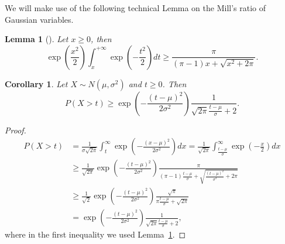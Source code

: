 \documentclass{article}
\newtheorem{lemma}[theorem]{Lemma}
\newtheorem{corrollary}[theorem]{Corollary}
\begin{document}
We will make use of the following technical Lemma on the Mill's ratio of Gaussian variables.
\begin{lemma}[\cite{Boyd59}]
\label{lemma:boyd}
Let $x\geq0$, then
\[
\exp\left(\frac{x^2}{2}\right) \int_{x}^{+\infty} \exp\left(-\frac{t^2}{2}\right) dt
\geq \frac{\pi}{(\pi-1)x+\sqrt{x^2+2 \pi}}.
\]
\end{lemma}
%
\begin{corrollary}
Let $X \sim N(\mu, \sigma^2)$ and $t \geq 0$. Then
\[
P(X>t) \geq \exp\left(-\frac{(t-\mu)^2}{2 \sigma^2}\right) \frac{1}{\sqrt{2\pi}\frac{t-\mu}{\sigma}+2}.
\]
\end{corrollary}
%
\begin{proof}
\begin{align*}
P(X>t)
&= \frac{1}{\sigma \sqrt{2 \pi}} \int_t^{\infty} \exp(-\frac{(x-\mu)^2}{2 \sigma^2}) d x
= \frac{1}{\sqrt{2 \pi}} \int_\frac{t-\mu}{\sigma}^{\infty} \exp(-\frac{x}{2}) d x \\
&\geq \frac{1}{\sqrt{2 \pi}} \exp\left(-\frac{(t-\mu)^2}{2 \sigma^2}\right) \frac{\pi}{(\pi-1)\frac{t-\mu}{\sigma}+\sqrt{\frac{(t-\mu)^2}{\sigma^2}+2 \pi}} \\
&\geq \frac{1}{\sqrt{2}} \exp\left(-\frac{(t-\mu)^2}{2 \sigma^2}\right) \frac{\sqrt{\pi}}{\pi\frac{t-\mu}{\sigma}+\sqrt{2 \pi}} \\
&= \exp\left(-\frac{(t-\mu)^2}{2 \sigma^2}\right) \frac{1}{\sqrt{2\pi}\frac{t-\mu}{\sigma}+2},
\end{align*}
where in the first inequality we used Lemma~\ref{lemma:boyd}.
\end{proof}
\end{document}

